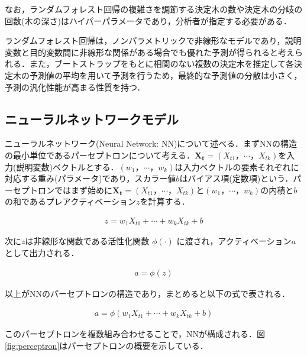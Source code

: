 \documentclass[a4paper，12pt]{jsarticle}
\begin{document}
なお，ランダムフォレスト回帰の複雑さを調節する決定木の数や決定木の分岐の回数(木の深さ)はハイパーパラメータであり，分析者が指定する必要がある．

ランダムフォレスト回帰は，ノンパラメトリックで非線形なモデルであり，説明変数と目的変数間に非線形な関係がある場合でも優れた予測が得られると考えられる．また，ブートストラップをもとに相関のない複数の決定木を推定して各決定木の予測値の平均を用いて予測を行うため，最終的な予測値の分散は小さく，予測の汎化性能が高まる性質を持つ．

\subsection{ニューラルネットワークモデル}

ニューラルネットワーク(Neural Network: NN)について述べる．まずNNの構造の最小単位であるパーセプトロンについて考える．$\bm{X_t}=(X_{t1}，\cdots，X_{tk})$を入力(説明変数)ベクトルとする．$(w_1，\cdots，w_k)$は入力ベクトルの要素それぞれに対応する重み(パラメータ)であり，スカラー値$b$はバイアス項(定数項)という．パーセプトロンではまず始めに$\bm{X_t}=(X_{t1}，\cdots，X_{tk})$と$(w_1，\cdots，w_k)$の内積と$b$の和であるプレアクティベーション$z$を計算する．

\begin{equation}
  \begin{split}
    z = w_1 X_{t1} + \cdots + w_k X_{tk} + b
  \end{split}
\end{equation}

次に$z$は非線形な関数である活性化関数 $\phi(\cdot)$ に渡され，アクティベーション$a$として出力される．

\begin{equation}
  \begin{split}
    a = \phi(z)
  \end{split}
\end{equation}

以上がNNのパーセプトロンの構造であり，まとめると以下の式で表される．

\begin{equation}
  \begin{split}
    a = \phi \left(w_1 X_{t1} + \cdots + w_k X_{tk} + b \right)
  \end{split}
\end{equation}

このパーセプトロンを複数組み合わせることで，NNが構成される．図\ref{fig:perceptron}はパーセプトロンの概要を示している．
\end{document}
